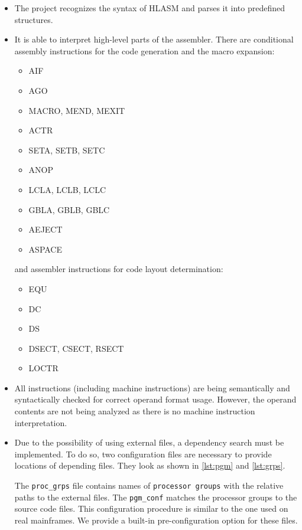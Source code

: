 \begin{itemize}
\item The project recognizes the syntax of HLASM and parses it into predefined structures. 

\item It is able to interpret high-level parts of the assembler. There are conditional assembly instructions for the code generation and the macro expansion:
\begin{itemize}
    \item AIF
    \item AGO
    \item MACRO, MEND, MEXIT
    \item ACTR
    \item SETA, SETB, SETC
    \item ANOP
    \item LCLA, LCLB, LCLC
    \item GBLA, GBLB, GBLC
    \item AEJECT
    \item ASPACE
\end{itemize}
and assembler instructions for code layout determination:
\begin{itemize}
    \item EQU 
    \item DC 
    \item DS 
    \item DSECT, CSECT, RSECT 
    \item LOCTR
\end{itemize}

\item All instructions (including machine instructions) are being semantically and syntactically checked for correct operand format usage. However, the operand contents are not being analyzed as there is no machine instruction interpretation.

\item Due to the possibility of using external files, a dependency search must be implemented. To do so, two configuration files are necessary to provide locations of depending files. They look as shown in \cref{lst:pgm} and \cref{lst:grps}. 

The \texttt{proc\_grps} file contains names of \texttt{processor groups} with the relative paths to the external files. The \texttt{pgm\_conf} matches the processor groups to the source code files. This configuration procedure is similar to the one used on real mainframes. We provide a built-in pre-configuration option for these files.


\end{itemize}
